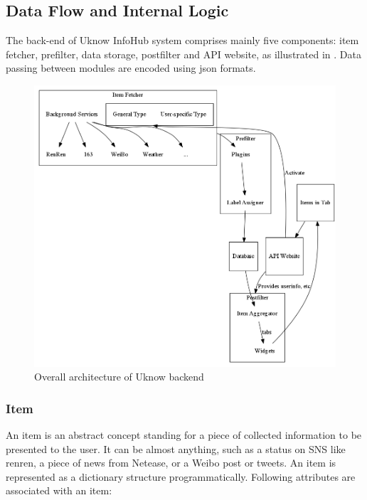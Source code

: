 \subsection{Data Flow and Internal Logic}

The back-end of Uknow InfoHub system comprises mainly five components: item
fetcher, prefilter, data storage, postfilter and API website, as
illustrated in .
Data passing between modules are encoded using json formats.

\begin{figure}[H]
  \centering
  \includegraphics[width=\textwidth]{img/architecture.png}
  \caption{Overall architecture of Uknow backend\label{fig:architecture}}
\end{figure}


\subsubsection{Item}

An item is an abstract concept standing for a piece of collected
information to be presented to the user. It can be almost anything, such
as a status on SNS like renren, a piece of news from Netease, or a Weibo post
or tweets. An item is represented as a dictionary structure
programmatically. Following attributes are associated with an item:

